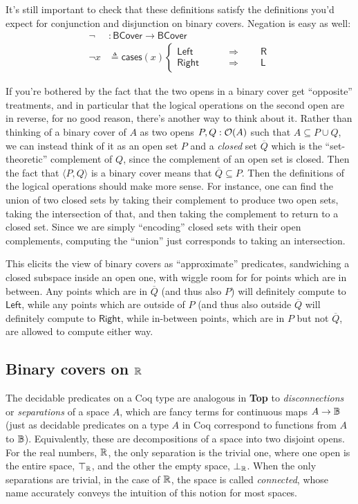 It's still important to check that these definitions satisfy the definitions you'd expect for conjunction and disjunction on binary covers. Negation is easy as well:
\begin{align*}
 \neg &: \mathsf{BCover} \to \mathsf{BCover}
\\ \neg x &\triangleq \mathsf{cases}(x)
\begin{cases}
\mathsf{Left}
 \qquad &\Rightarrow \qquad
 \mathsf{R}
\\
\mathsf{Right}
 \qquad &\Rightarrow \qquad
 \mathsf{L}
\end{cases}
\end{align*}

If you're bothered by the fact that the two opens in a binary cover get ``opposite'' treatments, and in particular that the logical operations on the second open are in reverse, for no good reason, there's another way to think about it. Rather than thinking of a binary cover of $A$ as two opens $P, Q : \mathcal{O}({A})$ such that $A \subseteq P \cup Q$, we can instead think of it as an open set $P$ and a \emph{closed} set $\overline{Q}$ which is the ``set-theoretic'' complement of $Q$, since the complement of an open set is closed. Then the fact that $\langle P, Q \rangle$ is a binary cover means that $\overline{Q} \subseteq P$. Then the definitions of the logical operations should make more sense. For instance, one can find the union of two closed sets by taking their complement to produce two open sets, taking the intersection of that, and then taking the complement to return to a closed set. Since we are simply ``encoding'' closed sets with their open complements, computing the ``union'' just corresponds to taking an intersection.

This elicits the view of binary covers as ``approximate'' predicates, sandwiching a closed subspace inside an open one, with wiggle room for for points which are in between. Any points which are in $\overline{Q}$ (and thus also $P$) will definitely compute to $\mathsf{Left}$, while any points which are outside of $P$ (and thus also outside $\overline{Q}$ will definitely compute to $\mathsf{Right}$, while in-between points, which are in $P$ but not $\overline{Q}$, are allowed to compute either way.

\subsection{Binary covers on $\mathbb{R}$}

The decidable predicates on a Coq type are analogous in \textbf{Top} to \emph{disconnections} or \emph{separations} of a space $A$, which are fancy terms for continuous maps $A \to \mathbb{B}$ (just as decidable predicates on a type $A$ in Coq correspond to functions from $A$ to $\mathbb{B}$). Equivalently, these are decompositions of a space into two disjoint opens. For the real numbers, $\mathbb{R}$, the only separation is the trivial one, where one open is the entire space, $\top_{\mathbb{R}}$, and the other the empty space, $\bot_{\mathbb{R}}$. When the only separations are trivial, in the case of $\mathbb{R}$, the space is called \emph{connected}, whose name accurately conveys the intuition of this notion for most spaces.

